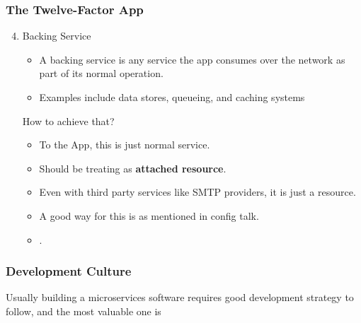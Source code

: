 \documentclass{beamer}
\begin{document}
		\begin{frame}
			\frametitle{The Twelve-Factor App}
				\begin{enumerate}
					\setcounter{enumi}{3}
					\item Backing Service \\
					\begin{itemize}
						\item A backing service is any service the app consumes over the network as part of its normal operation. 
						\item Examples include data stores, queueing, and caching systems
					\end{itemize}
					\vspace{2mm}
					
					\hspace{2mm} How to achieve that?\\
					\begin{itemize}
						\item<1-> \scriptsize {To the App, this is just normal service}.
						\item<2-> \scriptsize {Should be treating as \textbf {attached resource}}.
						\item<3-> \scriptsize {Even with third party services like SMTP providers, it is just a resource}.
						\item<4-> \scriptsize {A good way for this is as mentioned in config talk}.\\
							
						\item<5-> \small {\color{blue}{This way you can switch between services smoothly on different environments via configurations provided by the environment}}.
					\end{itemize}
				\end{enumerate}
			\vspace{100mm}
		\end{frame}
		
		
		\begin{frame}
			\frametitle{Development Culture}
				Usually building a microservices software requires good development strategy to follow, and the most valuable one is \\
				\vspace{100mm}
		\end{frame}
	
\end{document}
